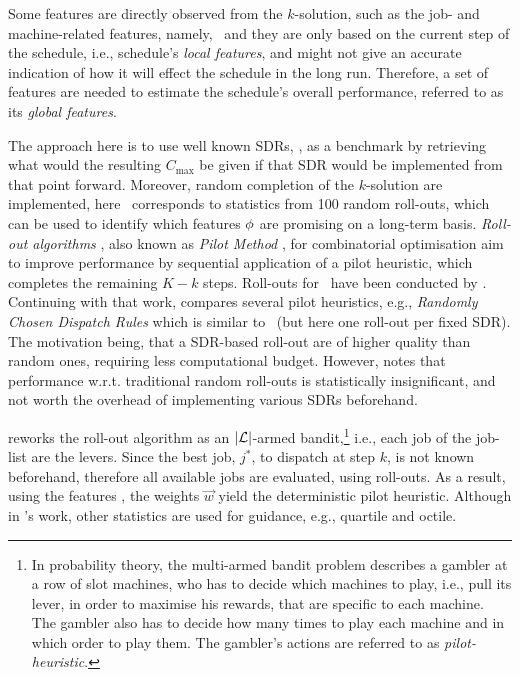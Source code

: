 Some features are directly observed from the $k$-solution, such as the job- 
and machine-related features, namely, \phiLocalRelated\ and they are only based 
on the current step of the schedule, 
i.e., schedule's \emph{local features}, and might not give an accurate 
indication of how it will effect the schedule in the long run. Therefore, a set 
of features are needed to estimate the schedule's overall performance, referred 
to as its \emph{global features}. 

The approach here is to use well known SDRs, \phiSDRRelated, as a benchmark by 
retrieving what would the resulting $C_{\max}$ be given if that SDR would 
be implemented from that point forward. 
Moreover, random completion of the $k$-solution are implemented, 
here \phiRNDRelated\ corresponds to statistics from 100 random roll-outs, which 
can be used to identify which features ${\mathbf{\phi}}$ are promising on a long-term 
basis. 
\emph{Roll-out algorithms} \citep{Bertsekas97}, also known as \emph{Pilot 
Method} \citep{Duin99}, for combinatorial optimisation aim to improve 
performance by sequential application of a pilot heuristic, which completes the 
remaining $K-k$ steps. Roll-outs for \JSP\ have been conducted by 
\citet{Ru12}. Continuing with that work, \citet{Geirsson2012} compares several 
pilot heuristics, e.g., \emph{Randomly Chosen Dispatch Rules} which is similar 
to \phiSDRRelated\ (but here one roll-out per fixed SDR). 
The motivation being, that a SDR-based roll-out are of higher quality than 
random ones, requiring less computational budget. 
However, \citeauthor{Geirsson2012} notes that performance w.r.t. traditional 
random roll-outs is statistically insignificant, and not worth the overhead of 
implementing various SDRs beforehand. 

\citeauthor{Geirsson2012} reworks the roll-out algorithm as an 
$\lvert\mathcal{L}\rvert$-armed bandit,\footnote{In probability theory, the
    multi-armed bandit problem \citep{badit:book} describes a gambler at a row 
    of slot machines, who has to decide which machines to play, i.e., pull its 
    lever, in  order to maximise his rewards, that are specific to each 
    machine. The gambler also has to decide how many times to play each machine 
    and in which order to play them. The gambler's actions are referred to as 
    \emph{pilot-heuristic}.} 
i.e., each job of the job-list are the levers. Since the best job, $j^*$, to 
dispatch at step $k$, is not known beforehand, therefore all available jobs are 
evaluated, using roll-outs. 
As a result, using the features \phiRNDRelated, the weights $\vec{w}$ yield the 
deterministic pilot heuristic. Although in \citeauthor{Geirsson2012}'s work, 
other statistics are used for guidance, e.g., quartile and octile. 

